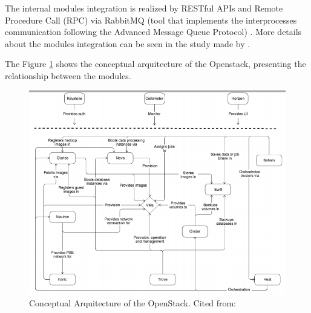 \documentclass[conference]{IEEEtran}
\begin{document}

The internal modules integration is realized by RESTful APIs and Remote Procedure Call (RPC) via RabbitMQ
(tool that implements the interprocesses communication following the Advanced Message Queue Protocol) \cite{bui2016}. More details about the modules integration can be seen in the study made by  \cite{bui2016}.


The Figure \ref{fig:openstack_architecture} shows the conceptual arquitecture of the Openstack, presenting the relationship between the modules. 

\begin{figure}[ht]
\centering
\includegraphics[width=.5\textwidth]{figuras/openstack_architecture.png}
\caption{Conceptual Arquitecture of the OpenStack. Cited from: \cite{openstack}}
\label{fig:openstack_architecture}
\end{figure}

\end{document}

